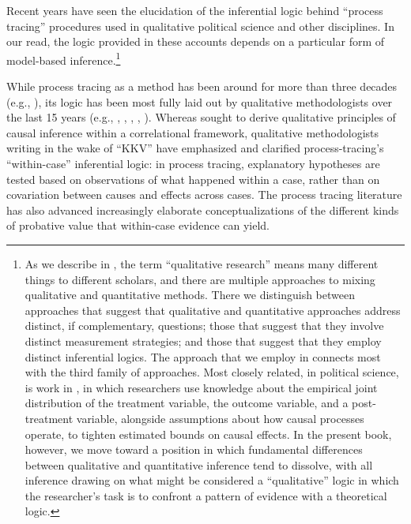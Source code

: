 \documentclass[12pt,]{book}
\let\rmarkdownfootnote\footnote%
\def\footnote{\protect\rmarkdownfootnote}
\begin{document}
Recent years have seen the elucidation of the inferential logic behind ``process tracing'' procedures used in qualitative political science and other disciplines. In our read, the logic provided in these accounts depends on a particular form of model-based inference.\footnote{As we describe in \citet{humphreys2015mixing}, the term ``qualitative research'' means many different things to different scholars, and there are multiple approaches to mixing qualitative and quantitative methods. There we distinguish between approaches that suggest that qualitative and quantitative approaches address distinct, if complementary, questions; those that suggest that they involve distinct measurement strategies; and those that suggest that they employ distinct inferential logics. The approach that we employ in \citet{humphreys2015mixing} connects most with the third family of approaches. Most closely related, in political science, is work in \citet{GlynnQuinn2011}, in which researchers use knowledge about the empirical joint distribution of the treatment variable, the outcome variable, and a post-treatment variable, alongside assumptions about how causal processes operate, to tighten estimated bounds on causal effects. In the present book, however, we move toward a position in which fundamental differences between qualitative and quantitative inference tend to dissolve, with all inference drawing on what might be considered a ``qualitative'' logic in which the researcher's task is to confront a pattern of evidence with a theoretical logic.}

While process tracing as a method has been around for more than three decades (e.g., \citet{george1985case}), its logic has been most fully laid out by qualitative methodologists over the last 15 years (e.g., \citet{bennett2014process}, \citet{george2005case}, \citet{brady2010rethinking}, \citet{Hall2003aligning}, \citet{mahoney2010after}). Whereas \citet{king1994designing} sought to derive qualitative principles of causal inference within a correlational framework, qualitative methodologists writing in the wake of ``KKV'' have emphasized and clarified process-tracing's ``within-case'' inferential logic: in process tracing, explanatory hypotheses are tested based on observations of what happened within a case, rather than on covariation between causes and effects across cases. The process tracing literature has also advanced increasingly elaborate conceptualizations of the different kinds of probative value that within-case evidence can yield.
\end{document}

